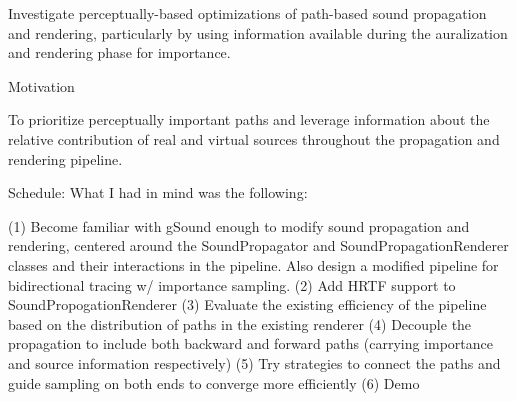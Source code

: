 Investigate perceptually-based optimizations of path-based sound propagation and rendering, particularly by using information available during the auralization and rendering phase for importance.


Motivation

To prioritize perceptually important paths and leverage information about the relative contribution of real and virtual sources throughout the propagation and rendering pipeline.

Schedule: What I had in mind was the following:

(1) Become familiar with gSound enough to modify sound propagation and rendering, centered around the SoundPropagator and SoundPropagationRenderer classes and their interactions in the pipeline. Also design a modified pipeline for bidirectional tracing w/ importance sampling.
(2) Add HRTF support to SoundPropogationRenderer
(3) Evaluate the existing efficiency of the pipeline based on the distribution of paths in the existing renderer
(4) Decouple the propagation to include both backward and forward paths (carrying importance and source information respectively)
(5) Try strategies to connect the paths and guide sampling on both ends to converge more efficiently
(6) Demo